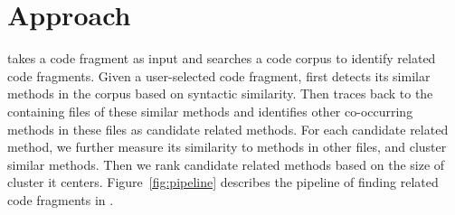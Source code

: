 \section{Approach}
\label{sec:approach}
{\tool} takes a code fragment as input and searches a code corpus to identify related code fragments. Given a user-selected code fragment, {\tool} first detects its similar methods in the corpus based on syntactic similarity. Then {\tool} traces back to the containing files of these similar methods and identifies other co-occurring methods in these files as candidate related methods. For each candidate related method, we further measure its similarity to methods in other files, and cluster similar methods. Then we rank candidate related methods based on the size of cluster it centers. Figure~\ref{fig:pipeline} describes the pipeline of finding related code fragments in {\tool}. 


